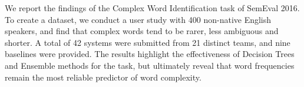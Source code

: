 We report the findings of the Complex Word Identification task of SemEval 2016. To create a dataset, we conduct a user study with 400 non-native English speakers, and find that complex words tend to be rarer, less ambiguous and shorter. A total of 42 systems were submitted from 21 distinct teams, and nine baselines were provided. The results highlight the effectiveness of Decision Trees and Ensemble methods for the task, but ultimately reveal that word frequencies remain the most reliable predictor of word complexity.
